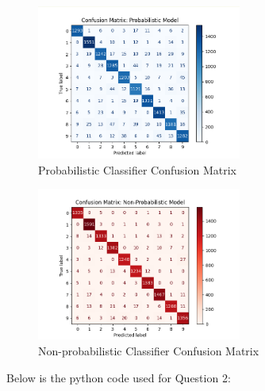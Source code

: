 \documentclass[10pt]{article}
\begin{document}
\begin{figure}[h]
    \includegraphics[width=0.6\textwidth]{../plots/q2/prob_confmatrix.png}
    \centering
    \caption{Probabilistic Classifier Confusion Matrix}
    \label{fig:prob_cmatrix}
\end{figure}

\begin{figure}[h]
    \includegraphics[width=0.6\textwidth]{../plots/q2/nonprob_confmatrix.png}
    \centering
    \caption{Non-probabilistic Classifier Confusion Matrix}
    \label{fig:nonprob_cmatrix}
\end{figure}


\clearpage
Below is the python code used for Question 2:

\end{document}
